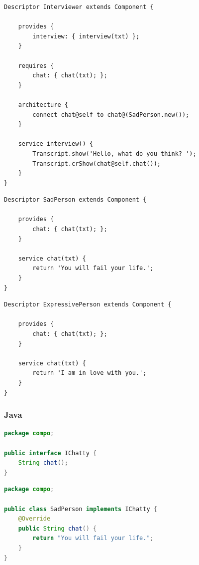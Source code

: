 \documentclass[11pt,a4paper,openany,oneside]{book}
\begin{document}
\begin{appendices}
\newpage

\begin{lstlisting}[language=Compo, frame=single, caption=Interviewer]
Descriptor Interviewer extends Component {

    provides {
        interview: { interview(txt) };
    }
    
    requires {
        chat: { chat(txt); };
    }
    
    architecture {
        connect chat@self to chat@(SadPerson.new());
    }
    
    service interview() {
        Transcript.show('Hello, what do you think? ');
        Transcript.crShow(chat@self.chat());
    }
}
\end{lstlisting}

\begin{lstlisting}[language=Compo, frame=single, caption=SadPerson]
Descriptor SadPerson extends Component {

    provides {
        chat: { chat(txt); };
    }
    
    service chat(txt) {
        return 'You will fail your life.';
    }
}
\end{lstlisting}

\begin{lstlisting}[language=Compo, frame=single, caption=ExpressivePerson]
Descriptor ExpressivePerson extends Component {

    provides {
        chat: { chat(txt); };
    }
    
    service chat(txt) {
        return 'I am in love with you.';
    }
}
\end{lstlisting}


\clearpage

\subsubsection{Java}

\begin{lstlisting}[language=Java, frame=single, caption=IChatty]
package compo;

public interface IChatty {
    String chat();
}
\end{lstlisting}

\begin{lstlisting}[language=Java, frame=single, caption=SadPerson]
package compo;

public class SadPerson implements IChatty {
    @Override
    public String chat() {
        return "You will fail your life.";
    }
}
\end{lstlisting}


\end{appendices}
\end{document}
